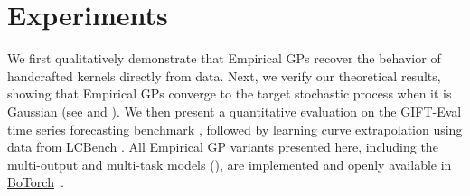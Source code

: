 \documentclass{article}
\newcommand{\stochprocess}{f}
\begin{document}

\section{Experiments}
\label{sec:Experiments}
We first qualitatively demonstrate that Empirical GPs recover the behavior of handcrafted kernels directly from data.
Next, we verify our theoretical results, showing that Empirical GPs converge to the target stochastic process when it is Gaussian (see  and ).
We then present a quantitative evaluation on the GIFT-Eval time series forecasting benchmark \citep{aksu2024gifteval}, followed by learning curve extrapolation using data from LCBench \citep{zimmer2021auto}. All Empirical GP variants presented here, including the multi-output and multi-task models (), are implemented and openly available in \href{https://github.com/pytorch/botorch}{BoTorch}~\citep{balandat2020botorch}.
\end{document}
